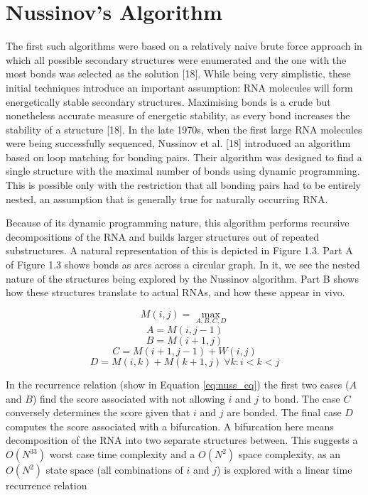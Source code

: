 \documentclass[12pt, a4paper]{article}
\begin{document}
\section*{Nussinov's Algorithm} The first such algorithms were based on a relatively naive brute force approach
in which all possible secondary structures were enumerated and the one with
the most bonds was selected as the solution [18]. While being very simplistic,
these initial techniques introduce an important assumption: RNA molecules will
form energetically stable secondary structures. Maximising bonds is a crude but
nonetheless accurate measure of energetic stability, as every bond increases the
stability of a structure [18]. In the late 1970s, when the first large RNA molecules
were being successfully sequenced, Nussinov et al. [18] introduced an algorithm
based on loop matching for bonding pairs. Their algorithm was designed to find a
single structure with the maximal number of bonds using dynamic programming. This is possible only with the restriction that all bonding pairs had to be entirely nested, an assumption that is generally true for naturally occurring RNA.



Because of its dynamic programming
nature, this algorithm performs recursive decompositions of the RNA and builds
larger structures out of repeated substructures. A natural representation of this is
depicted in Figure 1.3. Part A of Figure 1.3 shows bonds as arcs across a circular
graph. In it, we see the nested nature of the structures being explored by the
Nussinov algorithm. Part B shows how these structures translate to actual RNAs,
and how these appear in vivo.

\begin{equation} \label{eq:nuss_eq}
	M(i, j) = \max_{ A, B, C, D }
\end{equation}
\[
A = M(i, j-1)
\]
\[
B = M(i+1, j)
\]
\[
C = M(i+1, j-1) + W(i, j)
\]
\[
D = M(i, k) + M(k+1, j) \: \forall k: i < k < j
\]


In the recurrence relation (show in Equation \ref{eq:nuss_eq}) the first two cases ($A$ and $B$) find the score associated with not allowing $i$ and $j$ to bond. The case $C$ conversely determines the score given that $i$ and $j$ are bonded. The final case $D$ computes the score associated with a bifurcation. A bifurcation here means decomposition of the RNA into two separate structures between. This suggests a $O(N^33)$
worst case time complexity and a $O(N^2)$ space complexity, as an $O(N^2)$ state space (all combinations of $i$ and $j$) is explored
with a linear time recurrence relation
\end{document}

